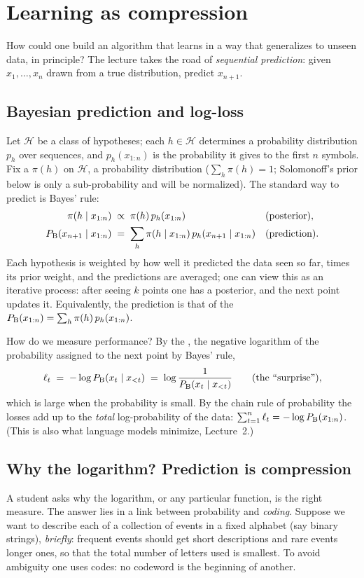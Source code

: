 \section{Learning as compression}\label{sec:L3-compression}
How could one build an algorithm that learns in a way that generalizes to unseen data, in principle? The lecture takes the road of \emph{sequential prediction}: given $x_1,\dots,x_n$ drawn from a true distribution, predict $x_{n+1}$.

\subsection{Bayesian prediction and log-loss}\label{sec:L3-bayes}
Let $\mathcal H$ be a class of hypotheses; each $h\in\mathcal H$ determines a probability distribution $p_h$ over sequences, and $p_h(x_{1:n})$ is the probability it gives to the first $n$ symbols. Fix a  $\pi(h)$ on $\mathcal H$, a probability distribution ($\sum_h\pi(h)=1$; Solomonoff's prior below is only a sub-probability and will be normalized).
The standard way to predict is Bayes' rule:
\begin{align}
  \pi(h\mid x_{1:n})&\;\propto\;\pi(h)\,p_h(x_{1:n}) &&\text{(posterior)},\label{eq:posterior}\\
  P_{\mathrm{B}}(x_{n+1}\mid x_{1:n})&\;=\;\sum_{h}\pi(h\mid x_{1:n})\,p_h(x_{n+1}\mid x_{1:n}) &&\text{(prediction)}.\label{eq:predict}
\end{align}
Each hypothesis is weighted by how well it predicted the data seen so far, times its prior weight, and the predictions are averaged; one can view this as an iterative process: after seeing $k$ points one has a posterior, and the next point updates it. Equivalently, the prediction is that of the  $P_{\mathrm{B}}(x_{1:n})=\sum_h\pi(h)\,p_h(x_{1:n})$.

How do we measure performance? By the , the negative logarithm of the probability assigned to the next point by Bayes' rule,
\[
  \ell_t\;=\;-\log P_{\mathrm{B}}(x_t\mid x_{<t})\;=\;\log\frac1{P_{\mathrm{B}}(x_t\mid x_{<t})}\qquad(\text{the ``surprise''}),
\]
which is large when the probability is small. By the chain rule of probability the losses add up to the \emph{total} log-probability of the data: $\sum_{t=1}^n\ell_t=-\log P_{\mathrm{B}}(x_{1:n})$. (This is also what language models minimize, Lecture~2.)

\subsection{Why the logarithm? Prediction is compression}\label{sec:L3-kraft}
A student asks why the logarithm, or any particular function, is the right measure. The answer lies in a link between probability and \emph{coding}. Suppose we want to describe each of a collection of events in a fixed alphabet (say binary strings), \emph{briefly}: frequent events should get short descriptions and rare events longer ones, so that the total number of letters used is smallest. To avoid ambiguity one uses
 codes: no codeword is the beginning of another.


